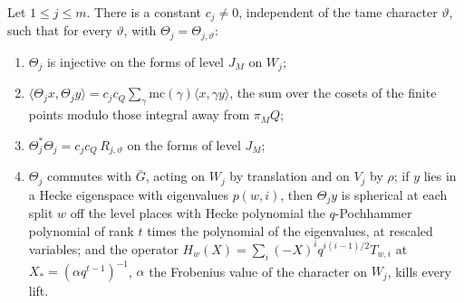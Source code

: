 \begin{theorem}\label{thm:norm-one-lift}
Let $1\le j\le m$. There is a constant $c_j\ne0$, independent of the tame character $\vartheta$, such that for every $\vartheta$, with $\Theta_j=\Theta_{j,\vartheta}$:
\begin{enumerate}[label=\textup{(\alph*)}]
\item $\Theta_j$ is injective on the forms of level $J_M$ on $W_j$;
\item $\langle\Theta_jx,\Theta_jy\rangle=c_jc_Q\sum_\gamma\mathrm{mc}(\gamma)\langle x,\gamma y\rangle$, the sum over the cosets of the finite points modulo those integral away from $\pi_MQ$;
\item $\Theta_j^*\Theta_j=c_jc_Q\,R_{j,\vartheta}$ on the forms of level $J_M$;
\item $\Theta_j$ commutes with $\bar G$, acting on $W_j$ by translation and on $V_j$ by $\rho$; if $y$ lies in a Hecke eigenspace with eigenvalues $p(w,i)$, then $\Theta_jy$ is spherical at each split $w$
off the level places with Hecke polynomial the $q$-Pochhammer polynomial of rank $t$ times the polynomial of the eigenvalues, at rescaled variables; and the operator
$H_w(X)=\sum_i(-X)^iq^{i(i-1)/2}T_{w,i}$ at $X_*=(\alpha q^{t-1})^{-1}$, $\alpha$ the Frobenius value of the character on $W_j$, kills every lift.
\end{enumerate}
\end{theorem}

